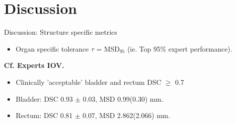 \documentclass[9pt]{beamer}
\begin{document}
\section{Discussion}
\begin{frame}{Discussion: Structure specific metrics}


\begin{itemize}
\item Organ specific tolerance $\tau$ = MSD$_{95}$ (ie. Top 95\% expert performance).\footnotemark[3]
\end{itemize}

\textbf{Cf. Experts IOV.}\footnotemark[2]
\begin{itemize}
\item Clinically 'acceptable' bladder and rectum DSC $\geq$ 0.7
\item Bladder:  DSC 0.93 $\pm$ 0.03, MSD 0.99(0.30) mm.
\item Rectum:  DSC 0.81 $\pm$ 0.07, MSD 2.862(2.066) mm.
\end{itemize}
\end{frame}
%
%
%

\end{document}
